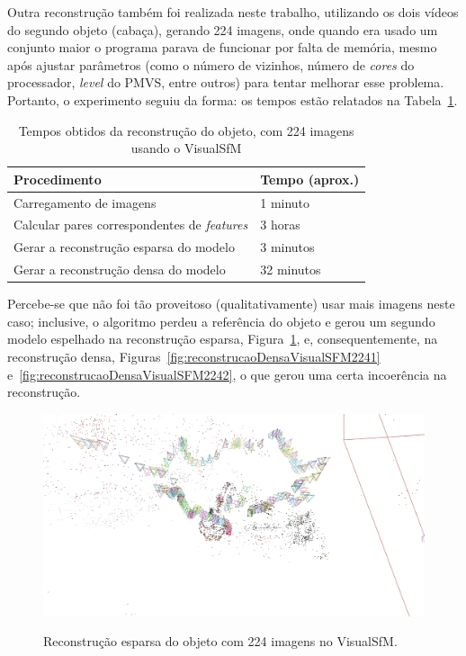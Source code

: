 Outra reconstrução também foi realizada neste trabalho, utilizando os dois
vídeos do segundo objeto (cabaça), gerando 224 imagens, onde quando era usado um conjunto maior o programa
parava de funcionar por falta de memória, mesmo após ajustar parâmetros (como o
número de vizinhos, número de \emph{cores} do processador, \emph{level} do PMVS,
entre outros) para tentar melhorar esse problema. Portanto, o experimento seguiu da
forma: os tempos estão relatados na Tabela~\ref{tab:temposSfM224}.

\begin{table}[h!]
\caption{Tempos obtidos da reconstrução do objeto, com 224 imagens usando o VisualSfM}
\label{tab:temposSfM224}
\begin{tabular}{|l|p{4.7cm}|}
\hline
Procedimento & Tempo (aprox.) \\ \hline
Carregamento de imagens & 1 minuto \\ \hline
Calcular pares correspondentes de \emph{features} & 3 horas \\ \hline
Gerar a reconstrução esparsa do modelo & 3 minutos \\ \hline
Gerar a reconstrução densa do modelo & 32 minutos \\ \hline
\end{tabular}
\end{table}

Percebe-se que não foi tão proveitoso (qualitativamente) usar mais imagens neste
caso; inclusive, o algoritmo perdeu a referência do objeto e gerou um segundo
modelo espelhado na reconstrução esparsa,
Figura~\ref{fig:reconstrucaoEsparsaVisualSFM224}, e, consequentemente, na
reconstrução densa,
Figuras~\ref{fig:reconstrucaoDensaVisualSFM2241} e~\ref{fig:reconstrucaoDensaVisualSFM2242}, o que gerou uma certa incoerência na reconstrução.

\begin{figure}[!h]
	\centering
\caption{%
	Reconstrução esparsa do objeto com 224 imagens no VisualSfM.
	}	
	\includegraphics[width=\linewidth]{figs/perto_longe_esparsa.jpg}
	\label{fig:reconstrucaoEsparsaVisualSFM224}
\end{figure}

